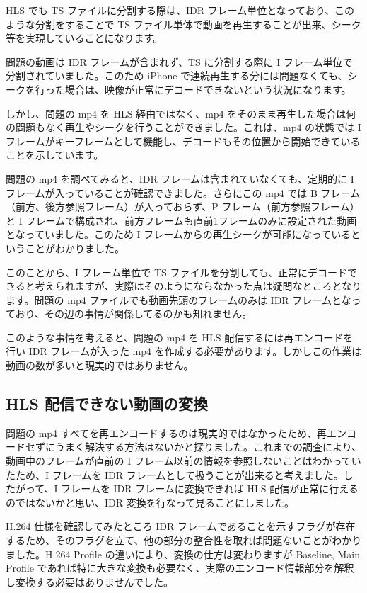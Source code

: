  HLS でも TS ファイルに分割する際は、IDR フレーム単位となっており、このような分割をすることで TS ファイル単体で動画を再生することが出来、シーク等を実現していることになります。

 問題の動画は IDR フレームが含まれず、TS に分割する際に I フレーム単位で分割されていました。このため iPhone で連続再生する分には問題なくても、シークを行った場合は、映像が正常にデコードできないという状況になります。

 しかし、問題の mp4 を HLS 経由ではなく、mp4 をそのまま再生した場合は何の問題もなく再生やシークを行うことができました。これは、mp4 の状態では I フレームがキーフレームとして機能し、デコードもその位置から開始できていることを示しています。

 問題の mp4 を調べてみると、IDR フレームは含まれていなくても、定期的に I フレームが入っていることが確認できました。さらにこの mp4 では B フレーム（前方、後方参照フレーム）が入っておらず、P フレーム（前方参照フレーム）と I フレームで構成され、前方フレームも直前1フレームのみに設定された動画となっていました。このため I フレームからの再生シークが可能になっているということがわかりました。

 このことから、I フレーム単位で TS ファイルを分割しても、正常にデコードできると考えられますが、実際はそのようにならなかった点は疑問なところとなります。問題の mp4 ファイルでも動画先頭のフレームのみは IDR フレームとなっており、その辺の事情が関係してるのかも知れません。

 このような事情を考えると、問題の mp4 を HLS 配信するには再エンコードを行い IDR フレームが入った mp4 を作成する必要があります。しかしこの作業は動画の数が多いと現実的ではありません。

\subsection{HLS 配信できない動画の変換}
 問題の mp4 すべてを再エンコードするのは現実的ではなかったため、再エンコードセずにうまく解決する方法はないかと探りました。これまでの調査により、動画中のフレームが直前の I フレーム以前の情報を参照しないことはわかっていたため、I フレームを IDR フレームとして扱うことが出来ると考えました。したがって、I フレームを IDR フレームに変換できれば HLS 配信が正常に行えるのではないかと思い、IDR 変換を行なって見ることにしました。

 H.264 仕様を確認してみたところ IDR フレームであることを示すフラグが存在するため、そのフラグを立て、他の部分の整合性を取れば問題ないことがわかりました。H.264 Profile の違いにより、変換の仕方は変わりますが Baseline, Main Profile であれば特に大きな変換も必要なく、実際のエンコード情報部分を解釈し変換する必要はありませんでした。

